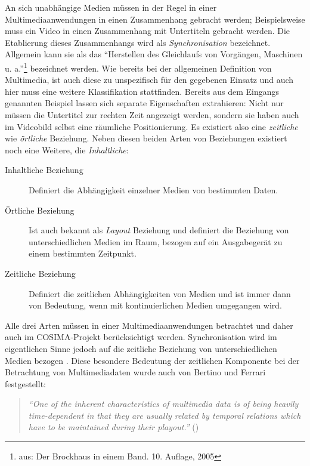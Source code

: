   An sich unabhängige Medien müssen in der Regel in einer Multimediaanwendungen in einen Zusammenhang gebracht werden; Beispielsweise muss ein Video in einen Zusammenhang mit Untertiteln gebracht werden. Die Etablierung dieses Zusammenhangs wird als \emph{Synchronisation} bezeichnet. Allgemein kann sie als das "`Herstellen des Gleichlaufs von Vorgängen, Maschinen u. a."'\footnote{aus: Der Brockhaus in einem Band. 10. Auflage, 2005} bezeichnet werden. Wie bereits bei der allgemeinen Definition von Multimedia, ist auch diese zu unspezifisch für den gegebenen Einsatz und auch hier muss eine weitere Klassifikation stattfinden. Bereits aus dem Eingangs genannten Beispiel lassen sich separate Eigenschaften extrahieren: Nicht nur müssen die Untertitel zur rechten Zeit angezeigt werden, sondern sie haben auch im Videobild selbst eine räumliche Positionierung. Es existiert also eine \emph{zeitliche} wie \emph{örtliche} Beziehung. Neben diesen beiden Arten von Beziehungen existiert noch eine Weitere, die \emph{Inhaltliche}:
  
  \begin{description}
    \item[Inhaltliche Beziehung] Definiert die Abhängigkeit einzelner Medien von bestimmten Daten.
    \item[Örtliche Beziehung] Ist auch bekannt als \emph{Layout} Beziehung und definiert die Beziehung von unterschiedlichen Medien im Raum, bezogen auf ein Ausgabegerät zu einem bestimmten Zeitpunkt.
    \item[Zeitliche Beziehung] Definiert die zeitlichen Abhängigkeiten von Medien und ist immer dann von Bedeutung, wenn mit kontinuierlichen Medien umgegangen wird.
  \end{description}
  
  Alle drei Arten müssen in einer Multimediaanwendungen betrachtet und daher auch im COSIMA-Projekt berücksichtigt werden. Synchronisation wird im eigentlichen Sinne jedoch auf die zeitliche Beziehung von unterschiedlichen Medien bezogen \citep[S. 572]{steinmetz1995mcc}. Diese besondere Bedeutung der zeitlichen Komponente bei der Betrachtung von Multimediadaten wurde auch von Bertino und Ferrari festgestellt:

  \begin{quote}
    \emph{"`One of the inherent characteristics of multimedia data is of being heavily time-dependent in that they are usually related by temporal relations which have to be maintained during their playout."'} (\citep[S. 612]{bertino1998tsm})
  \end{quote}
  
